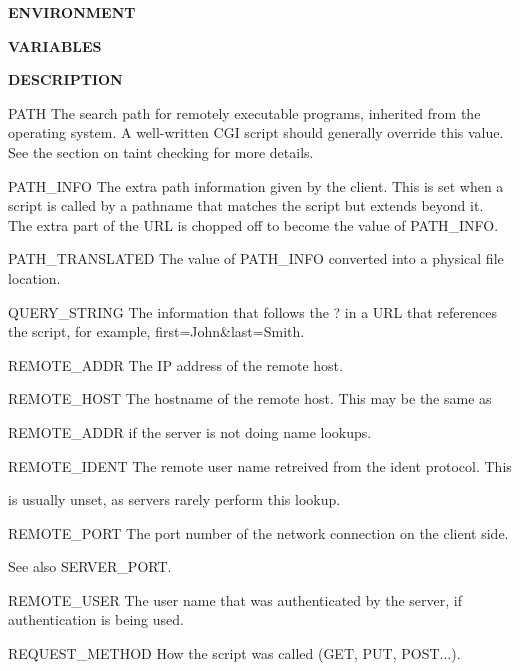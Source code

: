 \documentclass[a4paper,11pt]{book}
\begin{document}
\noindent 

\noindent 

\noindent \textbf{ENVIRONMENT}

\noindent \textbf{VARIABLES}

\noindent \textbf{DESCRIPTION}

\noindent 

\noindent PATH The search path for remotely executable programs, inherited from the operating system. A well-written CGI script should generally override this value. See the section on taint checking for more details.

\noindent 

\noindent PATH\_INFO The extra path information given by the client. This is set when a script is called by a pathname that matches the script but extends beyond it. The extra part of the URL is chopped off to become the value of PATH\_INFO.

\noindent 

\noindent PATH\_TRANSLATED The value of PATH\_INFO converted into a physical file location.

\noindent 

\noindent QUERY\_STRING The information that follows the ? in a URL that references the script, for example, first=John\&last=Smith.

\noindent 

\noindent REMOTE\_ADDR The IP address of the remote host.

\noindent 

\noindent REMOTE\_HOST The hostname of the remote host. This may be the same as

\noindent REMOTE\_ADDR if the server is not doing name lookups.

\noindent 

\noindent REMOTE\_IDENT The remote user name retreived from the ident protocol. This

\noindent is usually unset, as servers rarely perform this lookup.

\noindent 

\noindent REMOTE\_PORT The port number of the network connection on the client side.

\noindent See also SERVER\_PORT.

\noindent 

\noindent REMOTE\_USER The user name that was authenticated by the server, if authentication is being used.

\noindent 

\noindent REQUEST\_METHOD How the script was called (GET, PUT, POST...).
\end{document}
